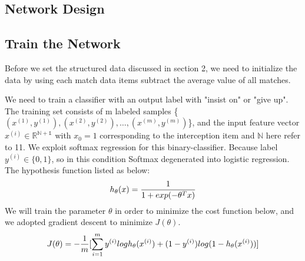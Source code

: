 \documentclass[a4paper, 11pt]{article} %
\begin{document}
\subsection{Network Design}


\subsection{Train the Network}
Before we set the structured data discussed in section 2, we need to initialize the data by using each match data items subtract the average value of all matches.

We need to train a classifier with an output label with "insist on" or "give up". The training set consists of m labeled samples \{${(x^{(1)},y^{(1)}),(x^{(2)},y^{(2)}), \dots,(x^{(m)},y^{(m)})}$\}, and the input feature vector $x^{(i)} \in \mathbb{R^{N+1}}$ with $x_0 = 1$ corresponding to the interception item and $\mathbb{N}$ here refer to 11. We exploit softmax regression for this binary-classifier. Because label $y^{(i)} \in \{0,1\}$, so in this condition Softmax degenerated into logistic regression. The hypothesis function listed as below:
 \begin{equation*}
 \centering
 h_\theta(x) = \frac{1}{1+exp(-\theta^Tx)}
 \end{equation*}
We will train the parameter $\theta$ in order to minimize the cost function below, and we adopted gradient descent to minimize $J(\theta)$.
 \begin{equation*}
 \centering
 J(\theta) = -\frac{1}{m}[\sum_{i=1}^{m}y^{(i)}logh_\theta(x^{(i)})+(1-y^{(i)})log(1-h_\theta(x^{(i)}))]
 \end{equation*}
 
\end{document}

